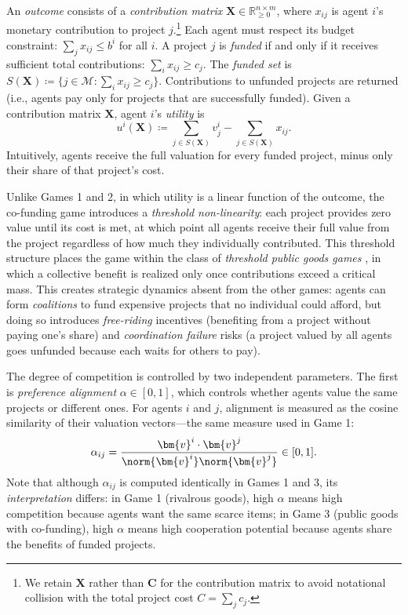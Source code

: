 An \emph{outcome} consists of a \emph{contribution matrix} $\bm{X} \in \mathbb{R}_{\geq 0}^{n \times m}$, where $x_{ij}$ is agent $i$'s monetary contribution to project $j$.\footnote{We retain $\bm{X}$ rather than $\bm{C}$ for the contribution matrix to avoid notational collision with the total project cost $C = \sum_j c_j$.}
Each agent must respect its budget constraint: $\sum_{j} x_{ij} \leq b^i$ for all $i$.
A project $j$ is \emph{funded} if and only if it receives sufficient total contributions: $\sum_{i} x_{ij} \geq c_j$.
The \emph{funded set} is $S(\bm{X}) \coloneqq \{j \in \mathcal{M} : \sum_{i} x_{ij} \geq c_j\}$.
Contributions to unfunded projects are returned (i.e., agents pay only for projects that are successfully funded).
Given a contribution matrix $\bm{X}$, agent $i$'s \emph{utility} is
\begin{equation}
    u^i(\bm{X}) \coloneqq \sum_{j \in S(\bm{X})} v^{i}_{j} - \sum_{j \in S(\bm{X})} x_{ij}.
\end{equation}
Intuitively, agents receive the full valuation for every funded project, minus only their share of that project's cost.

Unlike Games 1 and 2, in which utility is a linear function of the outcome, the co-funding game introduces a \emph{threshold non-linearity}: each project provides zero value until its cost is met, at which point all agents receive their full value from the project regardless of how much they individually contributed.
This threshold structure places the game within the class of \emph{threshold public goods games} \citep{palfrey1984testing}, in which a collective benefit is realized only once contributions exceed a critical mass.
This creates strategic dynamics absent from the other games: agents can form \emph{coalitions} to fund expensive projects that no individual could afford, but doing so introduces \emph{free-riding} incentives (benefiting from a project without paying one's share) and \emph{coordination failure} risks (a project valued by all agents goes unfunded because each waits for others to pay).

The degree of competition is controlled by two independent parameters.
The first is \emph{preference alignment} $\alpha \in [0,1]$, which controls whether agents value the same projects or different ones.
For agents $i$ and $j$, alignment is measured as the cosine similarity of their valuation vectors---the same measure used in Game 1:
\begin{equation}
    \alpha_{ij} = \frac{\bm{v}^{i} \cdot \bm{v}^{j}}{\norm{\bm{v}^{i}} \norm{\bm{v}^{j}}} \in [0,1].
\end{equation}
Note that although $\alpha_{ij}$ is computed identically in Games 1 and 3, its \emph{interpretation} differs: in Game 1 (rivalrous goods), high $\alpha$ means high competition because agents want the same scarce items; in Game 3 (public goods with co-funding), high $\alpha$ means high cooperation potential because agents share the benefits of funded projects.

